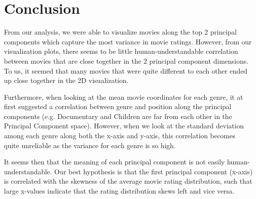 \newif\ifshowsolutions
\showsolutionsfalse


\renewcommand{\headrulewidth}{0.4pt}
\graphicspath{{../output/}}



\pagestyle{fancy}




\section{Conclusion}

From our analysis, we were able to visualize movies along the top 2 principal components which capture the most variance in movie ratings. However, from our visualization plots, there seems to be little human-understandable correlation between movies that are close together in the 2 principal component dimensions. To us, it seemed that many movies that were quite different to each other ended up close together in the 2D visualization. 

Furthermore, when looking at the mean movie coordinates for each genre, it at first suggested a correlation between genre and position along the principal components (e.g. Documentary and Children are far from each other in the Principal Component space). However, when we look at the standard deviation among each genre along both the x-axis and y-axis, this correlation becomes quite unreliable as the variance for each genre is so high. 

It seems then that the meaning of each principal component is not easily human-understandable. Our best hypothesis is that the first principal component (x-axis) is correlated with the skewness of the average movie rating distribution, such that large x-values indicate that the rating distribution skews left and vice versa.


